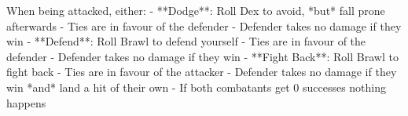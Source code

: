 When being attacked, either:
    - **Dodge**: Roll Dex to avoid, *but* fall prone afterwards
        - Ties are in favour of the defender
        - Defender takes no damage if they win
    - **Defend**: Roll Brawl to defend yourself
        - Ties are in favour of the defender
        - Defender takes no damage if they win
    - **Fight Back**: Roll Brawl to fight back  
        - Ties are in favour of the attacker
        - Defender takes no damage if they win *and* land a hit of their own
    - If both combatants get 0 successes nothing happens 



